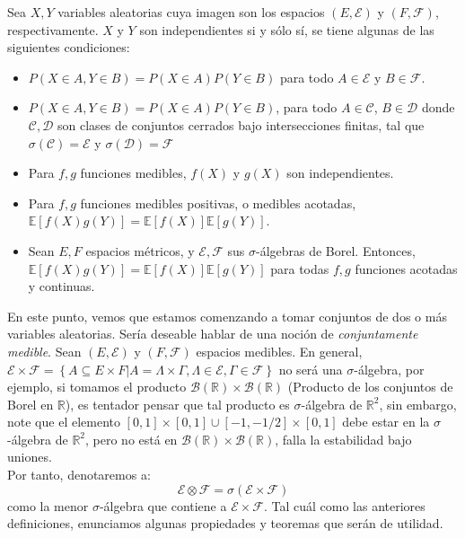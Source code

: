 \begin{theorem}
	Sea $X, Y$ variables aleatorias cuya imagen son los espacios $(E, \mathcal{E})$ y $(F, \mathcal{F})$, respectivamente. $X$ y $Y$ son independientes si y sólo sí, se tiene algunas de las siguientes condiciones:

	\begin{itemize}
		\item $P(X \in A, Y \in B) = P(X \in A)P(Y \in B)$ para todo $A \in \mathcal{E}$ y $B \in \mathcal{F}$.
		\item $P(X \in A, Y \in B) = P(X \in A)P(Y \in B)$, para todo $A \in \mathcal{C}$, $B \in \mathcal{D}$ donde $\mathcal{C}, \mathcal{D}$ son clases de conjuntos cerrados bajo intersecciones finitas, tal que $\sigma(\mathcal{C}) = \mathcal{E}$ y $\sigma( \mathcal{D} ) = \mathcal{F}$
		\item Para $f, g$ funciones medibles, $f(X)$ y $g(X)$ son independientes.
		\item Para $f, g$ funciones medibles positivas, o medibles acotadas, $\mathbb{E}[ f(X)g(Y) ] = \mathbb{E}[f(X)] \mathbb{E}[g(Y)]$.
		\item Sean $E, F$ espacios métricos, y $\mathcal{E}, \mathcal{F}$ sus $\sigma$-álgebras de Borel. Entonces, $\mathbb{E}[ f(X)g(Y) ] = \mathbb{E}[f(X)] \mathbb{E}[g(Y)]$ para todas $f, g$ funciones acotadas y continuas.
	\end{itemize}

\end{theorem}

En este punto, vemos que estamos comenzando a tomar conjuntos de dos o más variables aleatorias. Sería deseable hablar de una noción de \textit{conjuntamente medible}. Sean $(E, \mathcal{E})$ y $(F, \mathcal{F})$ espacios medibles. En general, $\mathcal{E} \times \mathcal{F} = \left\{ A \subseteq E \times F | A = \Lambda \times \Gamma, \Lambda \in \mathcal{E}, \Gamma \in \mathcal{F} \right\}$ no será una $\sigma$-álgebra, por ejemplo, si tomamos el producto $\mathcal{B}(\mathbb{R}) \times \mathcal{B}(\mathbb{R})$ (Producto de los conjuntos de Borel en $\mathbb{R}$), es tentador pensar que tal producto es $\sigma$-álgebra de $\mathbb{R}^2$, sin embargo, note que el elemento $[0, 1] \times [0,1] \cup [-1, -1/2] \times [0, 1]$ debe estar en la $\sigma$-álgebra de $\mathbb{R}^2$, pero no está en $\mathcal{B}(\mathbb{R}) \times \mathcal{B}(\mathbb{R})$, falla la estabilidad bajo uniones. \\

Por tanto, denotaremos a:
\[
	\mathcal{E} \otimes \mathcal{F} = \sigma(\mathcal{E} \times \mathcal{F})
\]
como la menor $\sigma$-álgebra que contiene a $\mathcal{E} \times \mathcal{F}$. Tal cuál como las anteriores definiciones, enunciamos algunas propiedades y teoremas que serán de utilidad.


